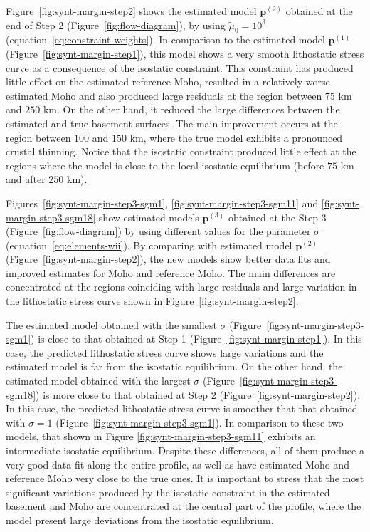 \documentclass[manuscript,revised]{geophysics}
\begin{document}
Figure~\ref{fig:synt-margin-step2} shows the estimated model $\mathbf{p}^{(2)}$ 
obtained at the end of Step 2 (Figure~\ref{fig:flow-diagram}), 
by using $\tilde{\mu}_{0} = 10^{3}$ (equation~\ref{eq:constraint-weights}).
In comparison to the estimated model $\mathbf{p}^{(1)}$ (Figure~\ref{fig:synt-margin-step1}),
this model shows a very smooth lithostatic stress curve as a consequence of the
isostatic constraint. This constraint has produced little effect on the
estimated reference Moho, resulted in a relatively worse estimated Moho and
also produced large residuals at the region between $75$ km and $250$ km.
On the other hand, it reduced the large differences between the estimated and 
true basement surfaces. The main improvement occurs at the region between  
$100$ and $150$ km, where the true model exhibits a 
pronounced crustal thinning. 
Notice that the isostatic constraint produced little effect at the regions
where the model is close to the local isostatic equilibrium 
(before $75$ km and after $250$ km).

Figures~\ref{fig:synt-margin-step3-sgm1}, \ref{fig:synt-margin-step3-sgm11} and 
\ref{fig:synt-margin-step3-sgm18} show estimated models $\mathbf{p}^{(3)}$ obtained at
the Step 3 (Figure~\ref{fig:flow-diagram}) by using different values for the parameter 
$\sigma$ (equation~\ref{eq:elements-wii}).
By comparing with estimated model $\mathbf{p}^{(2)}$
(Figure~\ref{fig:synt-margin-step2}), the new models 
show better data fits and improved estimates for Moho and reference Moho.
The main differences are concentrated at the regions coinciding with
large residuals and large variation in the lithostatic stress curve shown in 
Figure~\ref{fig:synt-margin-step2}.

The estimated model obtained with the smallest $\sigma$ 
(Figure~\ref{fig:synt-margin-step3-sgm1}) is close to that 
obtained at Step 1 (Figure~\ref{fig:synt-margin-step1}).
In this case, the predicted lithostatic stress curve shows large variations 
and the estimated model is far from the isostatic equilibrium.
On the other hand, the estimated model obtained with 
the largest $\sigma$ (Figure~\ref{fig:synt-margin-step3-sgm18}) is more close to 
that obtained at Step 2 (Figure~\ref{fig:synt-margin-step2}).
In this case, the predicted lithostatic stress curve is smoother that that obtained
with $\sigma = 1$ (Figure~\ref{fig:synt-margin-step3-sgm1}).
In comparison to these two models, that shown in Figure 
\ref{fig:synt-margin-step3-sgm11} exhibits an intermediate isostatic equilibrium.
Despite these differences, all of them produce a very good data fit along the 
entire profile, as well as have estimated Moho and reference Moho very close to the 
true ones. 
It is important to stress that the most significant variations produced by the 
isostatic constraint in the estimated basement and Moho are concentrated at the
central part of the profile, where the model present large deviations from the
isostatic equilibrium. 
\end{document}
